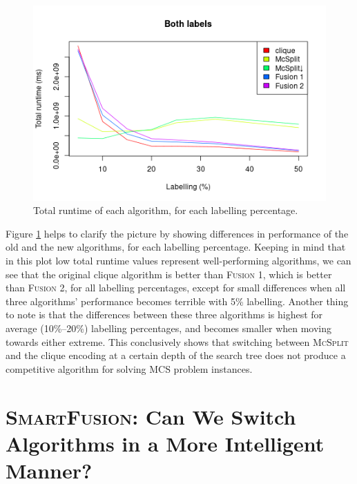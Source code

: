 \documentclass{l4proj}
\theoremstyle{definition}
\theoremstyle{remark}
\begin{document}
\begin{figure}
  \centering
  \includegraphics[scale=0.5]{images/fusion_linechart.png}
  \caption{Total runtime of each algorithm, for each labelling percentage.}
  \label{fig:fusion_lines}
\end{figure}

Figure \ref{fig:fusion_lines} helps to clarify the picture by showing
differences in performance of the old and the new algorithms, for each labelling
percentage. Keeping in mind that in this plot low total runtime values represent
well-performing algorithms, we can see that the original clique algorithm is
better than \textsc{Fusion 1}, which is better than \textsc{Fusion 2}, for all
labelling percentages, except for small differences when all three algorithms'
performance becomes terrible with 5\% labelling. Another thing to note is that
the differences between these three algorithms is highest for average
(10\%--20\%) labelling percentages, and becomes smaller when moving towards
either extreme. This conclusively shows that switching between \textsc{McSplit}
and the clique encoding at a certain depth of the search tree does not produce a
competitive algorithm for solving MCS problem instances.

\section{\textsc{SmartFusion}: Can We Switch Algorithms in a More Intelligent
  Manner?}
\end{document}
